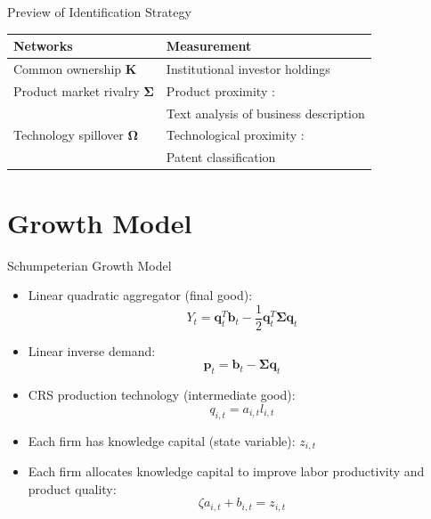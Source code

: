\documentclass[
  10pt,
  aspectratio=169,   %
  handout           %
]{beamer}
\theoremstyle{plain}
\begin{document}
\begin{frame}{Preview of Identification Strategy}
  \label{identification_overview} %
  \begin{center}
    \renewcommand{\arraystretch}{1.5} %
    \begin{tabular}{lV{\linewidth}}
      Networks                              & Measurement\tabularnewline
      \hline\hline
      Common ownership $\bm{K}$         & Institutional investor holdings \citep{Backus2021-yt} \tabularnewline
      \hline
      Product market rivalry $\bm{\Sigma}$ & Product proximity \citep{Hoberg2016-jm}: \tabularnewline
                                          & Text analysis of business description \tabularnewline
      \hline
      Technology spillover $\bm{\Omega}$   & Technological proximity \citep{Jaffe1986-yz,Bloom2013-pn}: \tabularnewline
                                          & Patent classification\tabularnewline
    \end{tabular}
    \renewcommand{\arraystretch}{1.0} %
  \end{center}
\end{frame}

\section{Growth Model}
\begin{frame}{Schumpeterian Growth Model}
  \begin{itemize}
    \item Linear quadratic aggregator (final good):
    \[
      Y_{t}=\bm{q}_{t}^{T}\bm{b}_{t}-\frac{1}{2}\bm{q}_{t}^{T}\bm{\Sigma}\bm{q}_{t}
    \]
    \item Linear inverse demand:
    \[
      \bm{p}_{t}=\bm{b}_{t}-\bm{\Sigma}\bm{q}_{t}
    \]
    \item CRS production technology (intermediate good): \[q_{i,t}=a_{i,t}l_{i,t}\]
    \item Each firm has knowledge capital (state variable): $z_{i,t}$
    \medskip{}
    \item Each firm allocates knowledge capital to improve labor productivity and product quality:
    \[
      \zeta a_{i,t}+b_{i,t}=z_{i,t}
    \]
  \end{itemize}
\end{frame}
\end{document}
